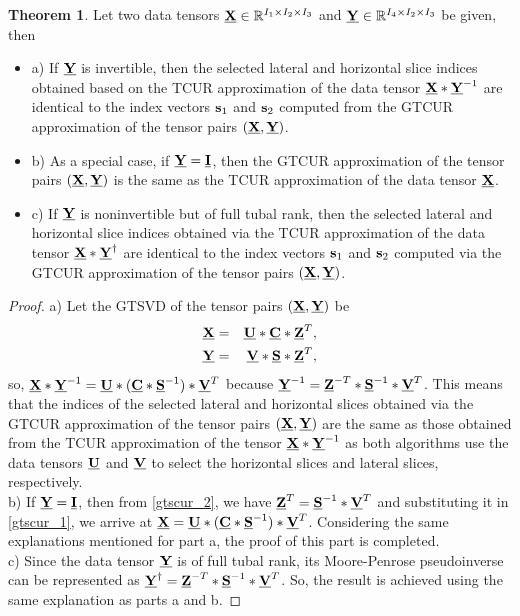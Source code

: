 \documentclass[preprint,12pt]{elsarticle}
\theoremstyle{definition}
\newtheorem{thm}{Theorem}
\newcommand{\cX}{\underline{\bf X}}
\newcommand{\cY}{\underline{\bf Y}}
\newcommand{\cU}{\underline{\bf U}}
\newcommand{\cV}{\underline{\bf V}}
\newcommand{\cZ}{\underline{\bf Z}}
\newcommand{\cS}{\underline{\bf S}}
\begin{document}
\begin{thm}\label{thm1}
Let two data tensors $\cX\in\mathbb{R}^{I_1\times I_2\times I_3}$ and $\cY\in\mathbb{R}^{I_4\times I_2 \times I_3}$ be given, then
\begin{itemize}
    \item a) If $\cY$ is invertible, then the selected lateral and horizontal slice indices obtained based on the TCUR approximation of the data tensor $\cX*\cY^{-1}$ are identical to the index vectors ${\bf s}_1$ and ${\bf s}_2$ computed from the GTCUR approximation of the tensor pairs $(\cX,\cY)$.

    \item b) As a special case, if $\cY=\underline{\bf I}$, then the GTCUR approximation of the tensor pairs $(\cX,\cY)$ is the same as the TCUR approximation of the data tensor $\cX$.

    \item c) If $\cY$ is noninvertible but of full tubal rank, then the selected lateral and horizontal slice indices obtained via the TCUR approximation of the data tensor $\cX*\cY^{\dag}$ are identical to the index vectors ${\bf s}_1$ and ${\bf s}_2$ computed via the GTCUR approximation of the tensor pairs $(\cX,\cY)$.
\end{itemize}
 

\end{thm}
\begin{proof}
a) Let the GTSVD of the tensor pairs $(\cX,\cY)$ be 
\begin{eqnarray}\label{gtscur_1}
\underline{\bf X}&=&\underline{\bf U}*\underline{\bf C}*\underline{\bf Z}^{T},\\\label{gtscur_2}
\underline{\bf Y}&=&\underline{\bf V}*\underline{\bf S}*\underline{\bf Z}^{T},
\end{eqnarray}
so, $\cX*\cY^{-1}=\cU*(\underline{\bf C}*\underline{\bf S}^{-1})*\underline{\bf V}^T$ because $\cY^{-1}=\cZ^{-T}*\cS^{-1}*\cV^{T}$. This means that the indices of the selected lateral and horizontal slices obtained via the GTCUR approximation of the tensor pairs $(\cX,\cY)$ are the same as those obtained from the TCUR approximation of the tensor $\cX*\cY^{-1}$ as both algorithms use the data tensors $\cU$ and $\cV$ to select the horizontal slices and lateral slices, respectively. \\

b) If $\cY=\underline{\bf I}$, then from \eqref{gtscur_2}, we have $\cZ^T=\underline{\bf S}^{-1}*\cV^T$ and substituting it in \eqref{gtscur_1}, we arrive at $\cX=\cU*(\underline{\bf C}*\underline{\bf S}^{-1})*\underline{\bf V}^T$. Considering the same explanations mentioned for part a, the proof of this part is completed. \\

c) Since the data tensor $\cY$ is of full tubal rank, its Moore-Penrose pseudoinverse can be represented as $\cY^{\dag}=\cZ^{-T}*\underline{\bf S}^{-1}*\cV^T$. So, the result is achieved using the same explanation as parts a and b.  
\end{proof}
\end{document}

